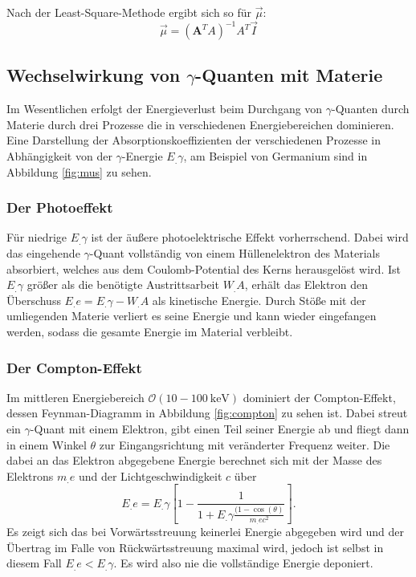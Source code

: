 Nach der Least-Square-Methode ergibt sich so für $\vec{\mu}$:
\begin{equation}
\vec{\mu} = (\mathbf{A}^T A)^{-1} A^T \vec{I}\label{eq:mu2}
\end{equation}

\subsection{Wechselwirkung von $\gamma$-Quanten mit Materie}
\label{subsec:WW}

Im Wesentlichen erfolgt der Energieverlust beim Durchgang von $\gamma$-Quanten durch Materie durch drei Prozesse die in verschiedenen Energiebereichen dominieren.
Eine Darstellung der Absorptionskoeffizienten der verschiedenen Prozesse in Abhängigkeit von der $\gamma$-Energie $E_.{\gamma}$, am Beispiel von Germanium sind in Abbildung \ref{fig:mus} zu sehen.

\subsubsection{Der Photoeffekt}

Für niedrige $E_.{\gamma}$ ist der äußere photoelektrische Effekt vorherrschend.
Dabei wird das eingehende $\gamma$-Quant vollständig von einem Hüllenelektron des Materials absorbiert, welches aus dem Coulomb-Potential des Kerns herausgelöst wird. Ist $E_.{\gamma}$ größer als die benötigte Austrittsarbeit $W_.A$, erhält das Elektron den Überschuss $E_.e = E_.{\gamma} - W_.A$ als kinetische Energie. Durch Stöße mit der umliegenden Materie verliert es seine Energie und kann wieder eingefangen werden, sodass die gesamte Energie im Material verbleibt.

\subsubsection{Der Compton-Effekt}

Im mittleren Energiebereich $\mathcal{O}(10 - \SI{100}{\kilo\eV})$ dominiert der Compton-Effekt, dessen Feynman-Diagramm in Abbildung \ref{fig:compton} zu sehen ist.
Dabei streut ein $\gamma$-Quant mit einem Elektron, gibt einen Teil seiner Energie ab und fliegt dann in einem Winkel $\theta$ zur Eingangsrichtung mit veränderter Frequenz weiter.
Die dabei an das Elektron abgegebene Energie berechnet sich mit der Masse des Elektrons $m_.e$ und der Lichtgeschwindigkeit $c$ über
\[
E_.e = E_.{\gamma}\left[1-\frac{1}{1+E_.{\gamma}\frac{(1-\cos(\theta)}{m_.ec^2}}\right]\text{.}
\]
Es zeigt sich das bei Vorwärtsstreuung keinerlei Energie abgegeben wird und der Übertrag im Falle von Rückwärtsstreuung maximal wird, jedoch ist selbst in diesem Fall $E_.e < E_.{\gamma}$. Es wird also nie die vollständige Energie deponiert.

